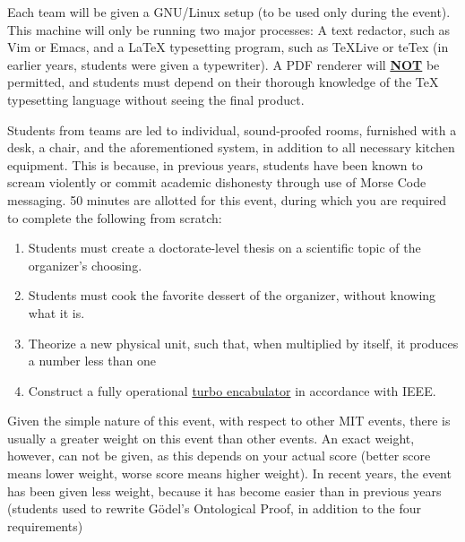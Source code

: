 \documentclass[a4paper]{article}
\def\summary#1{
\begin{tikzpicture}[overlay,remember picture,inner sep=0pt, outer sep=0pt]
\node[anchor=south,yshift=-1ex] at (current page text area.south) {%
\begin{minipage}{\textwidth}%
\begin{tcolorbox}[colframe=white,opacityback=0]
\begin{tcolorbox}[enhanced,colframe=black,fonttitle=\large\bfseries\sffamily,sidebyside=true, nobeforeafter,before=\vfil,after=\vfil,colupper=black,sidebyside align=top, lefthand width=.95\textwidth,opacitybacktitle=1, opacitytext=1,
segmentation style={black!55,solid,opacity=0,line width=3pt},
title=Summary
]
#1
\end{tcolorbox}
\end{tcolorbox}
\end{minipage}
};
\end{tikzpicture}
}
\begin{document}
\vspace{-30pt}

%
{Each team will be given a GNU/Linux setup (to be used only during the event). This machine will only be running two major processes: A text redactor, such as Vim or Emacs, and a LaTeX typesetting program, such as TeXLive or teTex (in earlier years, students were given a typewriter). A PDF renderer will \textbf{\underline{NOT}} be permitted, and students must depend on their thorough knowledge of the TeX typesetting language without seeing the final product.}%

\vspace{-30pt}

%
{Students from teams are led to individual, sound-proofed rooms, furnished with a desk, a chair, and the aforementioned system, in addition to all necessary kitchen equipment. This is because, in previous years, students have been known to scream violently or commit academic dishonesty through use of Morse Code messaging. 50 minutes are allotted for this event, during which you are required to complete the following from scratch: \begin{enumerate} \item Students must create a doctorate-level thesis on a scientific topic of the organizer's choosing. \item Students must cook the favorite dessert of the organizer, without knowing what it is.  \item Theorize a new physical unit, such that, when multiplied by itself, it produces a number less than one \item Construct a fully operational \href{https://en.wikipedia.org/wiki/Turboencabulator}{turbo encabulator} in accordance with IEEE.  \end{enumerate}}%

\vspace{-30pt}

%
{Given the simple nature of this event, with respect to other MIT events, there is usually a greater weight on this event than other events. An exact weight, however, can not be given, as this depends on your actual score (better score means lower weight, worse score means higher weight). In recent years, the event has been given less weight, because it has become easier than in previous years (students used to rewrite G\"odel's Ontological Proof, in addition to the four requirements)}%


\end{document}
